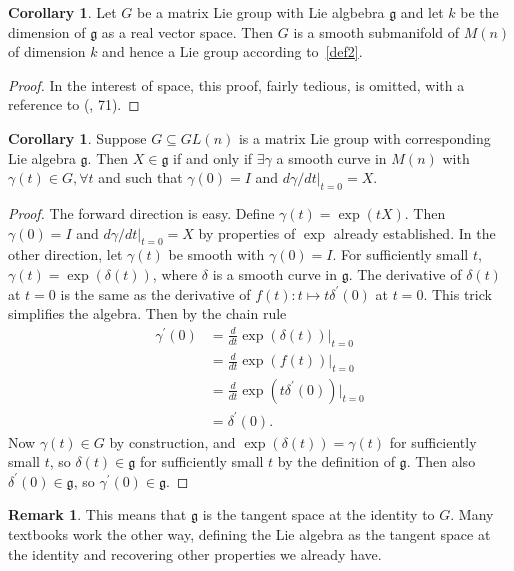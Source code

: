 \documentclass[12pt]{article}
\newcommand{\g}{\mathfrak{g}}
\theoremstyle{definition}
\theoremstyle{definition}
\newtheorem{cor}[them]{Corollary}
\theoremstyle{definition}
\theoremstyle{definition}
\newtheorem{rmk}[them]{Remark}
\theoremstyle{definition}
\theoremstyle{definition}
\theoremstyle{definition}
\theoremstyle{definition}
\begin{document}
\begin{cor} Let $G$ be a matrix Lie group with Lie
algbebra $\g$ and let $k$ be the dimension of $\g$
as a real vector space. Then $G$ is a smooth
submanifold of $M(n)$ of dimension $k$ and hence a
Lie group according to~\ref{def2}.
\end{cor}
\begin{proof}
In the interest of space, this proof, fairly
tedious, is omitted, with a reference to
(\cite{Hall}, 71).
\end{proof}

\begin{cor}
    Suppose $G \subseteq GL(n)$ is a matrix Lie
    group with corresponding Lie algebra $\g$.
    Then $X \in \g$ if and only if $\exists
    \gamma$ a smooth curve in $M(n)$ with
    $\gamma(t) \in G, \forall t$ and such that
    $\gamma(0) = I$ and $d\gamma/dt|_{t=0} = X$.
\end{cor}
\begin{proof}
The forward direction is easy. Define
$\gamma(t) = \exp(tX)$. Then $\gamma(0) = I$
and $d\gamma/dt|_{t=0}=X$ by properties of
$\exp$ already established. In the other
direction, let $\gamma(t)$ be smooth with
$\gamma(0) = I$. For sufficiently small $t$,
$\gamma(t) = \exp(\delta(t))$, where $\delta$
is a smooth curve in $\g$. The derivative of
$\delta(t)$ at $t = 0$ is the same as the
derivative of $f(t): t \mapsto t \delta^{\prime}(0)$
at $t = 0$. This trick simplifies the algebra.
Then by the chain rule
\[\begin{aligned}
    \gamma^\prime(0) & = \frac{d}{dt}\exp(\delta(t))\Big|_{t=0} \\
    & = \frac{d}{dt}\exp(f(t))\Big|_{t=0} \\
    & = \frac{d}{dt}\exp(t\delta^\prime(0))\Big|_{t=0} \\
    & = \delta^\prime(0).
\end{aligned}\] Now $\gamma(t) \in G$ by construction, and $\exp(\delta(t)) = \gamma(t)$ for sufficiently small $t$, so $\delta(t) \in \g$ for sufficiently small $t$ by the definition of $\g$. Then also $\delta^\prime(0) \in \g$, so $\gamma^\prime(0) \in \g$.
\end{proof}

\begin{rmk}
    This means that $\g$ is the tangent space at
    the identity to $G$. Many textbooks work the
    other way, defining the Lie algebra as the
    tangent space at the identity and recovering
    other properties we already have.
\end{rmk}
\end{document}
